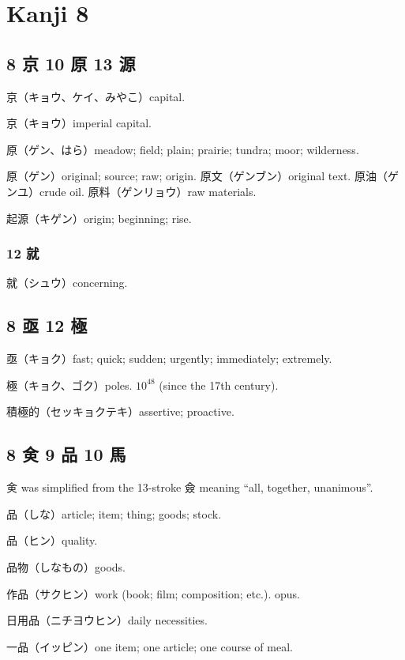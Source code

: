 \chapter{Kanji 8}

\section{8 京 10 原 13 源}

京（キョウ、ケイ、みやこ）capital.

京（キョウ）imperial capital.

原（ゲン、はら）meadow; field; plain; prairie; tundra; moor; wilderness.

原（ゲン）original; source; raw; origin.
原文（ゲンブン）original text.
原油（ゲンユ）crude oil.
原料（ゲンリョウ）raw materials.

起源（キゲン）origin; beginning; rise.

\subsection{12 就}

就（シュウ）concerning.

\section{8 亟 12 極}

亟（キョク）fast; quick; sudden; urgently; immediately; extremely.

極（キョク、ゴク）poles.
\(10^{48}\) (since the 17th century).

積極的（セッキョクテキ）assertive; proactive.

\section{8 㑒 9 品 10 馬}

㑒 was simplified from the 13-stroke 僉
meaning ``all, together, unanimous''.

品（しな）article; item; thing; goods; stock.

品（ヒン）quality.

品物（しなもの）goods.

作品（サクヒン）work (book; film; composition; etc.). opus.

日用品（ニチヨウヒン）daily necessities.

一品（イッピン）one item; one article; one course of meal.

